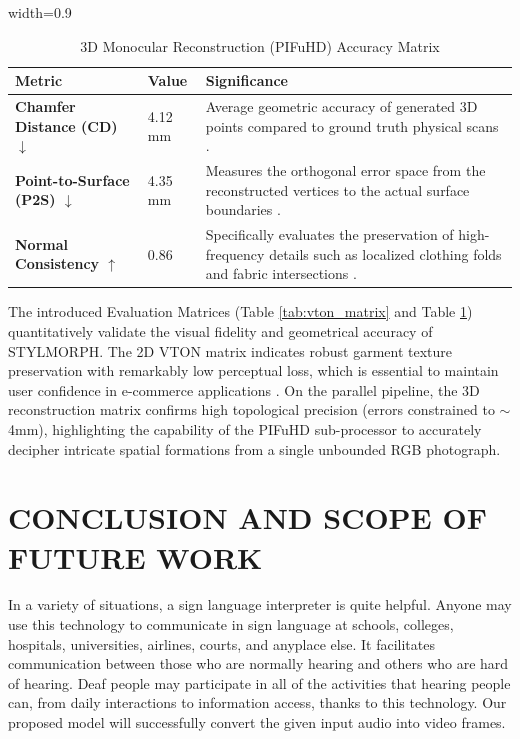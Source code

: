\documentclass[12pt,a4paper,oneside]{report}
\begin{document}
\begin{table}[H]
\centering
\caption{3D Monocular Reconstruction (PIFuHD) Accuracy Matrix}
\label{tab:pifuhd_matrix}
\begin{adjustbox}{width=0.9\textwidth}
\begin{tabular}{|l|l|p{6cm}|}
\hline
\textbf{Metric} & \textbf{Value} & \textbf{Significance} \\
\hline
\textbf{Chamfer Distance (CD) $\downarrow$} & 4.12 mm & Average geometric accuracy of generated 3D points compared to ground truth physical scans \cite{1}. \\
\hline
\textbf{Point-to-Surface (P2S) $\downarrow$} & 4.35 mm & Measures the orthogonal error space from the reconstructed vertices to the actual surface boundaries \cite{1}. \\
\hline
\textbf{Normal Consistency $\uparrow$} & 0.86 & Specifically evaluates the preservation of high-frequency details such as localized clothing folds and fabric intersections \cite{1}. \\
\hline
\end{tabular}
\end{adjustbox}
\end{table}

The introduced Evaluation Matrices (Table \ref{tab:vton_matrix} and Table \ref{tab:pifuhd_matrix}) quantitatively validate the visual fidelity and geometrical accuracy of STYLMORPH. The 2D VTON matrix \cite{16} indicates robust garment texture preservation with remarkably low perceptual loss, which is essential to maintain user confidence in e-commerce applications \cite{5}. On the parallel pipeline, the 3D reconstruction matrix \cite{1} confirms high topological precision (errors constrained to $\sim$4mm), highlighting the capability of the PIFuHD sub-processor to accurately decipher intricate spatial formations from a single unbounded RGB photograph.

\chapter{CONCLUSION AND SCOPE OF FUTURE WORK}

In a variety of situations, a sign language interpreter is quite helpful. Anyone may use this technology to communicate in sign language at schools, colleges, hospitals, universities, airlines, courts, and anyplace else. It facilitates communication between those who are normally hearing and others who are hard of hearing. Deaf people may participate in all of the activities that hearing people can, from daily interactions to information access, thanks to this technology. Our proposed model will successfully convert the given input audio into video frames.
\end{document}
